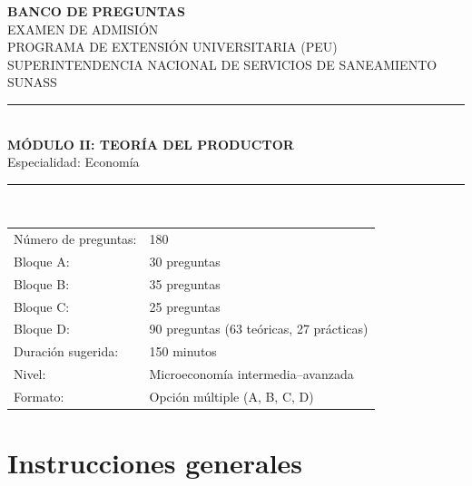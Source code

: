 \documentclass[11pt,a4paper]{article}
\begin{document}
\begin{titlepage}
\thispagestyle{empty}
\centering
\backboneportadaheader

{\Large\bfseries BANCO DE PREGUNTAS}\\[0.35cm]
{\large EXAMEN DE ADMISIÓN}\\[0.15cm]
{\large PROGRAMA DE EXTENSIÓN UNIVERSITARIA (PEU)}\\[0.15cm]
{\large SUPERINTENDENCIA NACIONAL DE SERVICIOS DE SANEAMIENTO}\\[0.05cm]
{\large SUNASS}\\[1.0cm]

\rule{\linewidth}{0.9pt}\\[0.55cm]
{\LARGE\bfseries MÓDULO II: TEORÍA DEL PRODUCTOR}\\[0.35cm]
{\large Especialidad: Economía}\\[0.55cm]
\rule{\linewidth}{0.9pt}\\[1.0cm]

\begin{tabular}{ll}
\toprule
Número de preguntas: & 180 \\
Bloque A: & 30 preguntas \\
Bloque B: & 35 preguntas \\
Bloque C: & 25 preguntas \\
Bloque D: & 90 preguntas (63 teóricas, 27 prácticas) \\
Duración sugerida: & 150 minutos \\
Nivel: & Microeconomía intermedia--avanzada \\
Formato: & Opción múltiple (A, B, C, D) \\
\bottomrule
\end{tabular}

\vfill
\backboneportadafooter
\end{titlepage}

\section*{Instrucciones generales}
\end{document}

